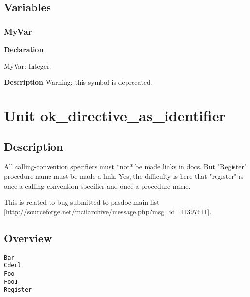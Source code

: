 \documentclass{report}
\begin{document}
\section{Variables}
\subsection*{MyVar}
\begin{list}{}{
\setlength{\itemindent}{0cm}
\setlength{\listparindent}{0cm}
\setlength{\leftmargin}{\evensidemargin}
\addtolength{\leftmargin}{\tmplength}
\settowidth{\labelsep}{X}
\addtolength{\leftmargin}{\labelsep}
\setlength{\labelwidth}{\tmplength}
}
\begin{flushleft}
\item[\textbf{Declaration}\hfill]
\begin{ttfamily}
MyVar: Integer;\end{ttfamily}


\end{flushleft}
\par
\item[\textbf{Description}]
Warning: this symbol is deprecated.

 

\end{list}
\chapter{Unit ok{\_}directive{\_}as{\_}identifier}
\section{Description}
All calling{-}convention specifiers must *not* be made links in docs. But "Register" procedure name must be made a link. Yes, the difficulty is here that "register" is once a calling{-}convention specifier and once a procedure name.

This is related to bug submitted to pasdoc{-}main list [http://sourceforge.net/mailarchive/message.php?msg{\_}id=11397611].
\section{Overview}
\begin{description}
\item[\texttt{\begin{ttfamily}TMyClass\end{ttfamily} Class}]
\end{description}
\begin{description}
\item[\texttt{Bar}]
\item[\texttt{Cdecl}]
\item[\texttt{Foo}]
\item[\texttt{Foo1}]
\item[\texttt{Register}]
\end{description}
\end{document}
